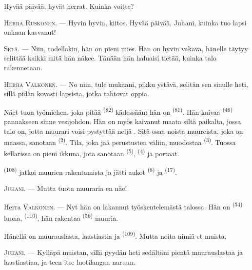 Hyvää päivää, hyvät herrat. Kuinka voitte?

\textsc{Herra Ruskonen}. --- Hyvin hyvin, kiitos. Hyvää päivää, Juhani, kuinka
tuo lapsi onkaan kasvanut!

\textsc{Setä}. --- Niin, todellakin, hän on pieni mies. Hän on hyvin vakava,
hänelle täytyy selittää kaikki mitä hän näkee. Tänään hän haluaisi tietää,
kuinka talo rakennetaan.

\VUsaut{3.0mm}

\textsc{Herra Valkonen}. --- No niin, tule mukaani, pikku ystävä, selitän sen
sinulle heti, sillä pidän kovasti lapsista, jotka tahtovat oppia.

Näet tuon työmiehen, joka pitää  \textsuperscript{(82)}
kädessään: hän on  \textsuperscript{(81)}. Hän kaivaa
 \textsuperscript{(46)} pannakseen sinne vesijohdon. Hän on myös
kaivanut maata siltä paikalta, jossa talo on, jotta muurari voisi pystyttää
neljä . Sitä osaa noista muureista, joka on maassa, sanotaan
 \textsuperscript{(2)}. Tila, joka jää perustusten väliin,
muodostaa  \textsuperscript{(3)}. Tuossa kellarissa on pieni
ikkuna, jota sanotaan  \textsuperscript{(5)},
 \textsuperscript{(4)} ja portaat.

 \textsuperscript{(108)} jatkoi muurien rakentamista ja jätti
aukot  \textsuperscript{(8)} ja 
\textsuperscript{(17)}.

\textsc{Juhani}. --- Mutta tuota muuraria en näe!

Herra \textsc{Valkonen}. --- Nyt hän on lakannut työskentelemästä talossa. Hän
on  \textsuperscript{(54)} luona, 
\textsuperscript{(110)}, hän rakentaa 
\textsuperscript{(56)} muuria.

Hänellä on muurauslasta, laastiastia ja 
\textsuperscript{(109)}. Mutta noita nimiä et muista.

\textsc{Juhani}. --- Kylläpä muistan, sillä pyydän heti sedältäni pientä
muurauslastaa ja laastiastiaa, ja teen itse luotilangan naruun.

\VUsaut{3.0mm}
\VUsaut{3.0mm}

